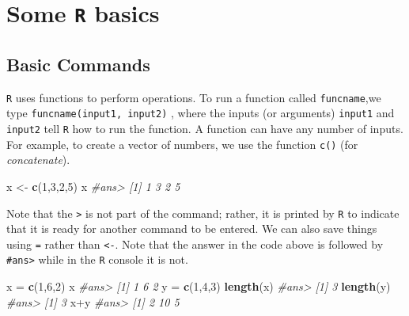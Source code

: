 \documentclass[]{book}
\newenvironment{Shaded}{\begin{snugshade}}{\end{snugshade}}
\newcommand{\KeywordTok}[1]{\textcolor[rgb]{0.13,0.29,0.53}{\textbf{{#1}}}}
\newcommand{\DecValTok}[1]{\textcolor[rgb]{0.00,0.00,0.81}{{#1}}}
\newcommand{\StringTok}[1]{\textcolor[rgb]{0.31,0.60,0.02}{{#1}}}
\newcommand{\CommentTok}[1]{\textcolor[rgb]{0.56,0.35,0.01}{\textit{{#1}}}}
\newcommand{\NormalTok}[1]{{#1}}
\begin{document}
\section{\texorpdfstring{Some \texttt{R}
basics}{Some R basics}}\label{some-r-basics}

\subsection{Basic Commands}\label{basic-commands}

\texttt{R} uses functions to perform operations. To run a function
called \texttt{funcname},we type \texttt{funcname(input1,\ input2)} ,
where the inputs (or arguments) \texttt{input1} and \texttt{input2} tell
\texttt{R} how to run the function. A function can have any number of
inputs. For example, to create a vector of numbers, we use the function
\texttt{c()} (for \emph{concatenate}).

\begin{Shaded}
\begin{Highlighting}[]
\NormalTok{x <-}\StringTok{ }\KeywordTok{c}\NormalTok{(}\DecValTok{1}\NormalTok{,}\DecValTok{3}\NormalTok{,}\DecValTok{2}\NormalTok{,}\DecValTok{5}\NormalTok{)}
\NormalTok{x}
\CommentTok{#ans> [1] 1 3 2 5}
\end{Highlighting}
\end{Shaded}

Note that the \texttt{\textgreater{}} is not part of the command;
rather, it is printed by \texttt{R} to indicate that it is ready for
another command to be entered. We can also save things using \texttt{=}
rather than \texttt{\textless{}-}. Note that the answer in the code
above is followed by \texttt{\#ans\textgreater{}} while in the
\texttt{R} console it is not.

\begin{Shaded}
\begin{Highlighting}[]
\NormalTok{x =}\StringTok{ }\KeywordTok{c}\NormalTok{(}\DecValTok{1}\NormalTok{,}\DecValTok{6}\NormalTok{,}\DecValTok{2}\NormalTok{)}
\NormalTok{x}
\CommentTok{#ans> [1] 1 6 2}
\NormalTok{y =}\StringTok{ }\KeywordTok{c}\NormalTok{(}\DecValTok{1}\NormalTok{,}\DecValTok{4}\NormalTok{,}\DecValTok{3}\NormalTok{)}
\KeywordTok{length}\NormalTok{(x)}
\CommentTok{#ans> [1] 3}
\KeywordTok{length}\NormalTok{(y)}
\CommentTok{#ans> [1] 3}
\NormalTok{x+y}
\CommentTok{#ans> [1]  2 10  5}
\end{Highlighting}
\end{Shaded}
\end{document}
